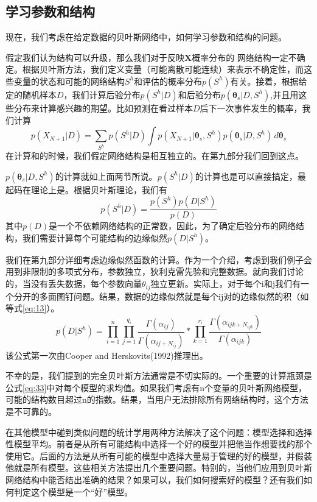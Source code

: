 \documentclass[10pt,a4paper]{article}
\begin{document}
\begin{CJK*}{UTF8}{gkai}
\section{学习参数和结构}
现在，我们考虑在给定数据的贝叶斯网络中，如何学习参数和结构的问题。


假定我们认为结构可以升级，那么我们对于反映$\boldsymbol{X}$概率分布的
网络结构一定不确定。根据贝叶斯方法，我们定义变量（可能离散可能连续）来表示不确定性，而这些变量的状态和可能的网络结构$S^h$和评估的概率分布$p(S^h)$有关。接着，根据给定的随机样本$D$，我们计算后验分布$p(S^h|D)$和后验分布$p(\boldsymbol{\theta}_s|D,S^h)$,并且用这些分布来计算感兴趣的期望。比如预测在看过样本$D$后下一次事件发生的概率，我们计算
\begin{equation}
\label{eq:33}
p(X_{N+1}|D)=\sum_{S^h} p(S^h|D) \int p(X_{N+1}|\boldsymbol{\theta}_s,S^h) p(\boldsymbol{\theta}_s|D,S^h)\,d\boldsymbol{\theta}_s
\end{equation}
在计算和的时候，我们假定网络结构是相互独立的。在第九部分我们回到这点。


$p(\boldsymbol{\theta}_s|D,S^h)$的计算就如上面两节所说。$p(S^h|D)$的计算也是可以直接搞定，最起码在理论上是。根据贝叶斯理论，我们有
\begin{equation}
p(S^h|D)=\frac{p(S^h)p(D|S^h)}{p(D)}
\end{equation}
其中$p(D)$是一个不依赖网络结构的正常数，因此，为了确定后验分布的网络结构，我们需要计算每个可能结构的边缘似然$p(D|S^h)$。


我们在第九部分详细考虑边缘似然函数的计算。作为一个介绍，考虑到我们例子会用到非限制的多项式分布，参数独立，狄利克雷先验和完整数据。就向我们讨论的，当没有丢失数据，每个参数向量$\theta_{ij}$独立更新。实际上，对于每个i和j我们有一个分开的多面图钉问题。结果，数据的边缘似然就是每个ij对的边缘似然的积（如等式\ref{eq:13}）。
\begin{equation}
p(D|S^h)=\prod_{i=1}^n \prod_{j=1}^{q_i} \frac{\Gamma(\alpha_{ij})}{\Gamma(\alpha_{ij+N_{ij}})}* \prod_{k=1}^{r_i} \frac{\Gamma(\alpha_{ijk+N_{ijk}})}{\Gamma(\alpha_{ijk})}
\end{equation}
该公式第一次由Cooper and Herskovits(1992)推理出。


不幸的是，我们提到的完全贝叶斯方法通常是不切实际的。一个重要的计算瓶颈是公式\ref{eq:33}中对每个模型的求均值。如果我们考虑有n个变量的贝叶斯网络模型，可能的结构数目超过n的指数。结果，当用户无法排除所有网络结构时，这个方法是不可靠的。


在其他模型中碰到类似问题的统计学用两种方法解决了这个问题：模型选择和选择性模型平均。前者是从所有可能结构中选择一个好的模型并把他当作想要找的那个使用它。后面的方法是从所有可能的模型中选择大量易于管理的好的模型，并假装他就是所有模型。这些相关方法提出几个重要问题。特别的，当他们应用到贝叶斯网络结构中能否结出准确的结果？如果可以，我们如何搜索好的模型？还有我们如何判定这个模型是一个“好”模型。



\end{CJK*}
\end{document}
